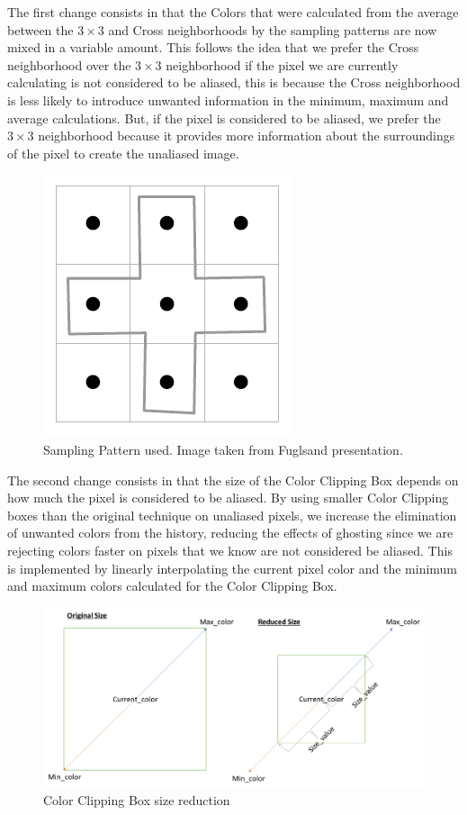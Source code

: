\documentclass{cslthse-msc}
\begin{document}
The first change consists in that the Colors that were calculated from the average between the $3\times 3$ and Cross neighborhoods by the sampling patterns are now mixed in a variable amount. This follows the idea that we prefer the Cross neighborhood over the $3\times 3$ neighborhood if the pixel we are currently calculating is not considered to be aliased, this is because the Cross neighborhood is less likely to introduce unwanted information in the minimum, maximum and average calculations. But, if the pixel is considered to be aliased, we prefer the $3\times 3$ neighborhood because it provides more information about the surroundings of the pixel to create the unaliased image. 

\begin{figure}[!hbt]
	\centering
	\includegraphics[scale=0.3]{images/sampling_pattern.png}
	\caption{Sampling Pattern used. Image taken from Fuglsand presentation. \protect\cite{Fuglsand2016}}\label{fig:samplingpattern_2}
\end{figure}

The second change consists in that the size of the Color Clipping Box depends on how much the pixel is considered to be aliased. By using smaller Color Clipping boxes than the original technique on unaliased pixels, we increase the elimination of unwanted colors from the history, reducing the effects of ghosting since we are rejecting colors faster on pixels that we know are not considered be aliased. This is implemented by linearly interpolating the current pixel color and the minimum and maximum colors calculated for the Color Clipping Box.

\begin{figure}[!hbt]
	\centering
	\includegraphics[scale=0.7]{images/clipping_box_reduction.png}
	\caption{Color Clipping Box size reduction}\label{fig:colorclippingboxredux}
\end{figure}
\end{document}
